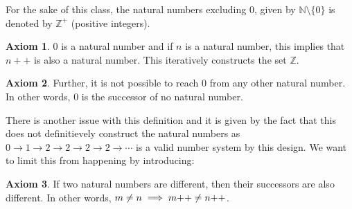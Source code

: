 \documentclass[14pt]{extarticle}
\theoremstyle{definition}
\theoremstyle{axiom}
\newtheorem{axiom}{Axiom}[section]
\begin{document}
For the sake of this class, the natural numbers excluding $0$, given by $\mathbb{N}\setminus \{0\}$
is denoted by $\mathbb{Z}^\plus$ (positive integers).

\begin{axiom}
    0 is a natural number and if $n$ is a natural number, this implies that $n++$ is also a natural number.
    This iteratively constructs the set $\mathbb{Z}$. 
\end{axiom}

\begin{axiom}
    Further, it is not possible to reach $0$ from any other natural number. In other words, 
    $0$ is the successor of no natural number.
\end{axiom}

There is another issue with this definition and it is given by the fact that this does not 
definitievely construct the natural numbers as $0 \to 1 \to 2 \to 2 \to 2 \to 2 \to \cdots$
is a valid number system by this design. We want to limit this from happening by introducing:

\begin{axiom}
    If two natural numbers are different, then their successors are also different. In other words,
    $m \neq n \implies m\tiny{++} \neq n\tiny{++}$.
\end{axiom}

\vspace{1cm}
\end{document}
